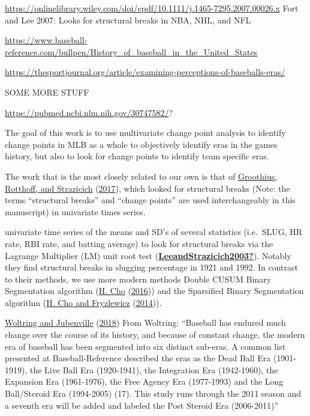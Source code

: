 \documentclass[
  12pt,
]{article}
\begin{document}
\url{https://onlinelibrary.wiley.com/doi/epdf/10.1111/j.1465-7295.2007.00026.x}
Fort and Lee 2007: Looks for structural breaks in NBA, NHL, and NFL

\url{https://www.baseball-reference.com/bullpen/History_of_baseball_in_the_United_States}

\url{https://thesportjournal.org/article/examining-perceptions-of-baseballs-eras/}

SOME MORE STUFF

\url{https://pubmed.ncbi.nlm.nih.gov/30747582/}?

The goal of this work is to use multivariate change point analysis to
identify change points in MLB as a whole to objectively identify eras in
the games history, but also to look for change points to identify team
specific eras.

The work that is the most closely related to our own is that of
\protect\hyperlink{ref-Groothius2017}{Groothius, Rotthoff, and
Strazicich} (\protect\hyperlink{ref-Groothius2017}{2017}), which looked
for structural breaks (Note: the terms ``structural breaks'' and
``change points'' are used interchangeably in this manuscript) in
univariate times series.

univariate time series of the means and SD's of several statistics
(i.e.~SLUG, HR rate, RBI rate, and batting average) to look for
structural breaks via the Lagrange Multiplier (LM) unit root test
(\protect\hyperlink{ref-LeeandStrazicich2003}{\textbf{LeeandStrazicich2003?}}).
Notably they find structural breaks in slugging percentage in 1921 and
1992. In contrast to their methods, we use more modern methods Double
CUSUM Binary Segmentation algorithm (\protect\hyperlink{ref-Cho2016}{H.
Cho} (\protect\hyperlink{ref-Cho2016}{2016})) and the Sparsified Binary
Segmentation algorithm (\protect\hyperlink{ref-ChoFryzlewwicz2014}{H.
Cho and Fryzlewicz} (\protect\hyperlink{ref-ChoFryzlewwicz2014}{2014})).

\protect\hyperlink{ref-Woltring2018}{Woltring and Jubenville}
(\protect\hyperlink{ref-Woltring2018}{2018}) From Woltring: ``Baseball
has endured much change over the course of its history, and because of
constant change, the modern era of baseball has been segmented into six
distinct sub-eras. A common list presented at Baseball-Reference
described the eras as the Dead Ball Era (1901-1919), the Live Ball Era
(1920-1941), the Integration Era (1942-1960), the Expansion Era
(1961-1976), the Free Agency Era (1977-1993) and the Long Ball/Steroid
Era (1994-2005) (17). This study runs through the 2011 season and a
seventh era will be added and labeled the Post Steroid Era (2006-2011)''
\end{document}
